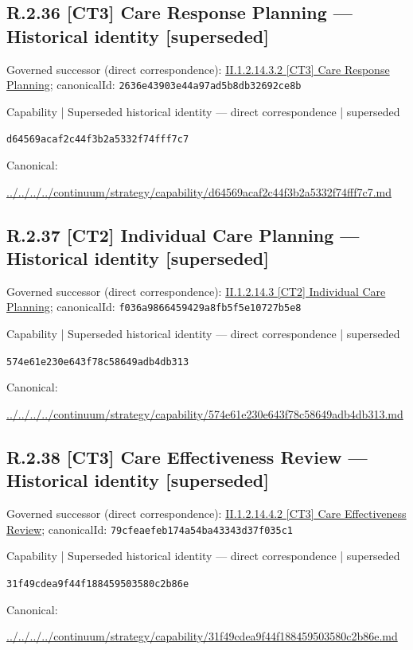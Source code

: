 \documentclass[10pt,a4paper]{article}
\begin{document}
\subsection*{R.2.36 [CT3] Care Response Planning — Historical identity [superseded]}
Governed successor (direct correspondence): \hyperref[element-2636e43903e44a97ad5b8db32692ce8b]{II.1.2.14.3.2 [CT3] Care Response Planning}; canonicalId: \texttt{2636e43903e44a97ad5b8db32692ce8b}\par
\label{element-d64569acaf2c44f3b2a5332f74fff7c7}
{\small Capability | Superseded historical identity — direct correspondence | superseded}\par
\texttt{d64569acaf2c44f3b2a5332f74fff7c7}\par
Canonical: \par
{\footnotesize\url{../../../../continuum/strategy/capability/d64569acaf2c44f3b2a5332f74fff7c7.md}}\par
\subsection*{R.2.37 [CT2] Individual Care Planning — Historical identity [superseded]}
Governed successor (direct correspondence): \hyperref[element-f036a9866459429a8fb5f5e10727b5e8]{II.1.2.14.3 [CT2] Individual Care Planning}; canonicalId: \texttt{f036a9866459429a8fb5f5e10727b5e8}\par
\label{element-574e61e230e643f78c58649adb4db313}
{\small Capability | Superseded historical identity — direct correspondence | superseded}\par
\texttt{574e61e230e643f78c58649adb4db313}\par
Canonical: \par
{\footnotesize\url{../../../../continuum/strategy/capability/574e61e230e643f78c58649adb4db313.md}}\par
\subsection*{R.2.38 [CT3] Care Effectiveness Review — Historical identity [superseded]}
Governed successor (direct correspondence): \hyperref[element-79cfeaefeb174a54ba43343d37f035c1]{II.1.2.14.4.2 [CT3] Care Effectiveness Review}; canonicalId: \texttt{79cfeaefeb174a54ba43343d37f035c1}\par
\label{element-31f49cdea9f44f188459503580c2b86e}
{\small Capability | Superseded historical identity — direct correspondence | superseded}\par
\texttt{31f49cdea9f44f188459503580c2b86e}\par
Canonical: \par
{\footnotesize\url{../../../../continuum/strategy/capability/31f49cdea9f44f188459503580c2b86e.md}}\par
\end{document}
